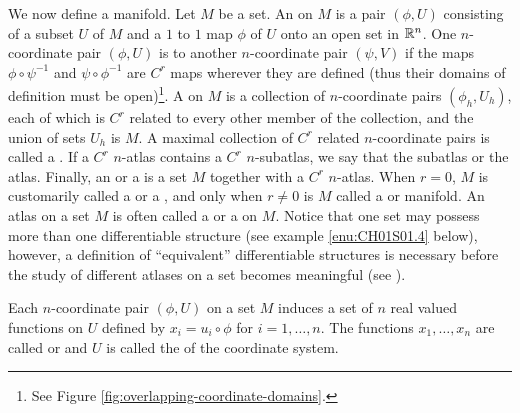 \documentclass[../main]{subfiles}
\begin{document}
We now define a manifold. Let $M$ be a set. An  on $M$ is a pair $(\phi, U)$ consisting of a subset $U$ of $M$ and a $1$ to $1$ map $\phi$ of $U$ onto an open set in $\mathbb{R}^n$. One $n$-coordinate pair $(\phi, U)$ is  to another $n$-coordinate pair $(\psi, V)$ if the maps $\phi\circ\psi^{-1}$ and $\psi\circ\phi^{-1}$ are $C^r$ maps wherever they are defined (thus their domains of definition must be open)\footnote{See Figure \ref{fig:overlapping-coordinate-domains}.}. A  on $M$ is a collection of $n$-coordinate pairs $(\phi_h, U_h)$, each of which is $C^r$ related to every other member of the collection, and the union of sets $U_h$ is $M$. A maximal collection of $C^r$ related $n$-coordinate pairs is called a . If a $C^r$ $n$-atlas contains a $C^r$ $n$-subatlas, we say that the subatlas  or  the atlas. Finally, an  or a  is a set $M$ together with a $C^r$ $n$-atlas. When $r=0$, $M$ is customarily called a  or a , and only when $r \ne 0$ is $M$ called a  or  manifold. An atlas on a set $M$ is often called a  or a  on $M$. Notice that one set may possess more than one differentiable structure (see example \ref{enu:CH01S01.4} below), however, a definition of ``equivalent'' differentiable structures is necessary before the study of different atlases on a set becomes meaningful (see \cite{munkres1966elementary}).

Each $n$-coordinate pair $(\phi, U)$ on a set $M$ induces a set of $n$ real valued functions on $U$ defined by $x_i = u_i \circ \phi$ for $i = 1,\dots, n$. The functions $x_1,\dots,x_n$ are called  or  and $U$ is called the  of the coordinate system.
\end{document}

